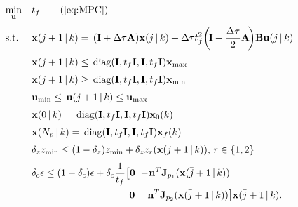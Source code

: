 \begin{subequations}
\label{eq:MPC}
\begin{align}
    \underset{\mathbf{u}}{\min} \quad & t_{f} \tag{\ref{eq:MPC}} \\[1mm]
	\text{s.t.} \quad \,\,  &\mathbf{x}(j+1 \,|\,k) = \,(\mathbf{I}+\Delta\tau \mathbf{A})\mathbf{x}(j\,|\,k) +
	 \Delta \tau t_f^2 \!\left(\!\mathbf{I}+\frac{\Delta \tau}{2}\mathbf{A}\!\right)\!\mathbf{B}\mathbf{u}(j\,|\,k) \label{eq:dynamic} \\[1mm]
	 &\mathbf{x}(j+1\,|\,k) \leq \, \text{diag}(\mathbf{I},t_f\mathbf{I},\mathbf{I},t_f\mathbf{I}) \mathbf{x}_{\max} \label{eq:xilim1}\\[1mm]
	 &\mathbf{x}(j+1\,|\,k) \geq  \, \text{diag}(\mathbf{I},t_f\mathbf{I},\mathbf{I},t_f\mathbf{I})
	 \mathbf{x}_{\min} \label{eq:xilim2}\\[1mm]
	 &\mathbf{u}_{\min} \leq  \, \mathbf{u}(j+1 \,|\, k) \leq \mathbf{u}_{\max} \label{eq:ulim}\\[1mm]
	 &\mathbf{x}(0 \,| \, k) =  \, \text{diag}(\mathbf{I},t_f\mathbf{I},\mathbf{I},t_f\mathbf{I}) \mathbf{x}_0(k)  \label{eq:initstate} \\[1mm]
	 &\mathbf{x}(N_p \,| \, k) =  \, \text{diag}(\mathbf{I},t_f\mathbf{I},\mathbf{I},t_f\mathbf{I}) \mathbf{x}_f(k) \label{eq:desiredstate} \\[1mm]
	 &\delta_z z_{\min} \leq (1-\delta_z)z_{\min}
	 + \delta_z z_r(\mathbf{x}(j+1 \,| \,k)), \, r \in \{1,2\} \label{eq:height}\\[1mm]
     &\delta_c \epsilon \leq (1-\delta_c)\epsilon + \delta_c\frac{1}{t_f} 
     \big[ \mathbf{0} \,\, -\!\mathbf{n}^T\mathbf{J}_{p_1}(\mathbf{x}(\bar{j}+1 \,| \,k))  \label{eq:coll}\\ \nonumber 
     &\qquad \qquad \hphantom{+\delta_c \epsilon \leq \delta_c\frac{1}{t_f} \big[}\, 
     \mathbf{0} \,\, \hphantom{-\,}\mathbf{n}^T\mathbf{J}_{p_2}(\mathbf{x}(\bar{j}+1 \,| \,k))\big]
     \mathbf{x}(\bar{j}+1 \,| \,k). 
\end{align}
\end{subequations}